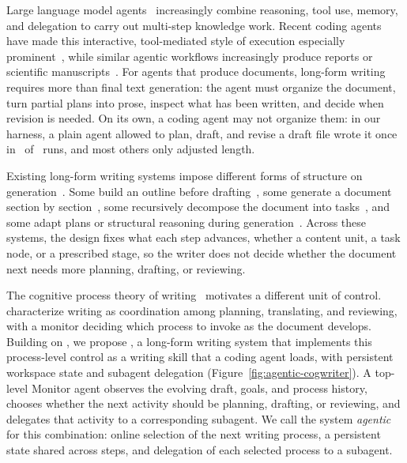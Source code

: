 Large language model agents~\citep{yao2023react,shinn2023reflexion,sumers2024cognitive,luo2025llmagent} increasingly combine reasoning, tool use, memory, and delegation to carry out multi-step knowledge work.
Recent coding agents have made this interactive, tool-mediated style of execution especially prominent~\citep{yang2024sweagent,wang2024openhands}, while similar agentic workflows increasingly produce reports or scientific manuscripts~\citep{schmidgall2025agentlab,lu2024aiscientist}.
For agents that produce documents, long-form writing requires more than final text generation: the agent must organize the document, turn partial plans into prose, inspect what has been written, and decide when revision is needed.
On its own, a coding agent may not organize them: in our harness, a plain agent allowed to plan, draft, and revise a draft file wrote it once in \PlainAgentWrittenOnceRuns\ of \PlainAgentCompletedRuns\ runs, and most others only adjusted length.



Existing long-form writing systems impose different forms of structure on generation~\citep{yao2019plan,yang2022re3,shao2024assisting,bai2025longwriter,xiong2025beyond,sun2026cot}.
Some build an outline before drafting~\citep{yao2019plan,yang2022re3}, some generate a document section by section~\citep{shao2024assisting,bai2025longwriter,huot2025agents}, some recursively decompose the document into tasks~\citep{xiong2025beyond}, and some adapt plans or structural reasoning during generation~\citep{wan2025cognitive,sun2026cot}.
Across these systems, the design fixes what each step advances, whether a content unit, a task node, or a prescribed stage, so the writer does not decide whether the document next needs more planning, drafting, or reviewing.

The cognitive process theory of writing~\citep{flower1981cognitive,hayes1996new,hayes2012modeling} motivates a different unit of control.
\citet{flower1981cognitive} characterize writing as coordination among planning, translating, and reviewing, with a monitor deciding which process to invoke as the document develops.
Building on \citet{flower1981cognitive}, we propose \condAgenticCogWriter, a long-form writing system that implements this process-level control as a writing skill that a coding agent loads, with persistent workspace state and subagent delegation (Figure~\ref{fig:agentic-cogwriter}).
A top-level Monitor agent observes the evolving draft, goals, and process history, chooses whether the next activity should be planning, drafting, or reviewing, and delegates that activity to a corresponding subagent.
We call the system \textit{agentic} for this combination: online selection of the next writing process, a persistent state shared across steps, and delegation of each selected process to a subagent.

